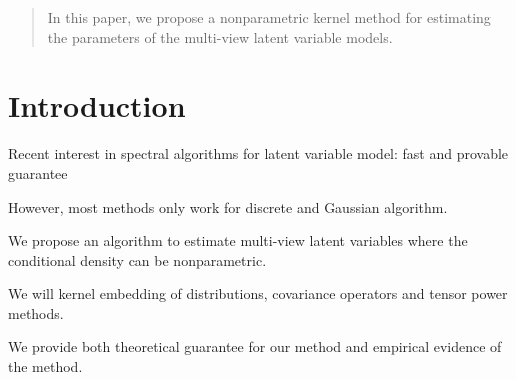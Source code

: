 \documentclass{article}
\begin{document}

\begin{abstract}
    In this paper, we propose a nonparametric kernel method for estimating the parameters of the multi-view latent variable models. 
\end{abstract}

\section{Introduction} \label{sec:intro}

%

\setlength{\textfloatsep}{3ex}

Recent interest in spectral algorithms for latent variable model: fast and provable guarantee

However, most methods only work for discrete and Gaussian algorithm. 

We propose an algorithm to estimate multi-view latent variables where the conditional density can be nonparametric. 

We will kernel embedding of distributions, covariance operators and tensor power methods. 

We provide both theoretical guarantee for our method and empirical evidence of the method. 

\end{document}
